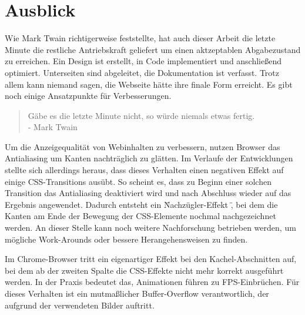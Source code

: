 \chapter{Ausblick}
Wie Mark Twain richtigerweise feststellte, hat auch dieser Arbeit die letzte Minute die restliche Antriebskraft geliefert um einen aktzeptablen Abgabezustand zu erreichen. Ein Design ist erstellt, in Code implementiert und anschließend optimiert. Unterseiten sind abgeleitet, die Dokumentation ist verfasst. Trotz allem kann niemand sagen, die Webseite hätte ihre finale Form erreicht. Es gibt noch einige Ansatzpunkte für Verbesserungen.

\begin{quote}
	Gäbe es die letzte Minute nicht, so würde niemals etwas fertig.\\
	- Mark Twain
\end{quote}

Um die Anzeigequalität von Webinhalten zu verbessern, nutzen Browser das Antialiasing um Kanten nachträglich zu glätten. Im Verlaufe der Entwicklungen stellte sich allerdings heraus, dass dieses Verhalten einen negativen Effekt auf einige CSS-Transitions ausübt. So scheint es, dass zu Beginn einer solchen Transition das Antialiasing deaktiviert wird und nach Abschluss wieder auf das Ergebnis angewendet. Dadurch entsteht ein \" Nachzügler-Effekt \", bei dem die Kanten am Ende der Bewegung der CSS-Elemente nochmal nachgezeichnet werden.
An dieser Stelle kann noch weitere Nachforschung betrieben werden, um mögliche Work-Arounds oder bessere Herangehensweisen zu finden.

Im Chrome-Browser tritt ein eigenartiger Effekt bei den Kachel-Abschnitten auf, bei dem ab der zweiten Spalte die CSS-Effekte nicht mehr korrekt ausgeführt werden. In der Praxis bedeutet das, Animationen führen zu FPS-Einbrüchen. Für dieses Verhalten ist ein mutmaßlicher Buffer-Overflow verantwortlich, der aufgrund der verwendeten Bilder auftritt.